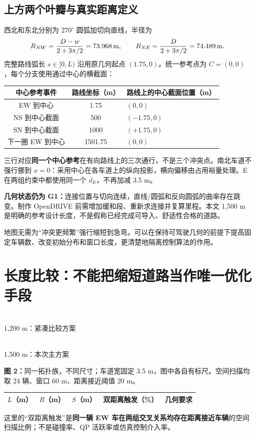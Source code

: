 \documentclass[UTF8,fontset=fandol,11pt,a4paper]{ctexart}
\newcommand{\unit}[1]{\,\mathrm{#1}}\newcommand{\nom}{\mathrm{nom}}
\newcommand{\page}[1]{\clearpage\section{#1}}
\begin{document}
\subsection{上方两个叶瓣与真实距离定义}
西北和东北分别为 $270^\circ$ 圆弧加切向直线，半径为
\[
R_{NW}=\frac{D-w}{2+3\pi/2}=\NorthWestRadius\unit{m},\qquad
R_{NE}=\frac{D}{2+3\pi/2}=\NorthEastRadius\unit{m}.
\]
完整路线弧长 $s\in[0,L)$ 沿用原几何起点 $(1.75,0)$。统一参考点为 $C=(0,0)$，每个分支使用通过中心的横截面：
\begin{center}
\begin{tabular}{ccl}\toprule
中心参考事件 & 路线坐标（m） & 路线上的中心截面位置（m）\\\midrule
EW 到中心 & 1.75 & $(0,0)$\\
NS 到中心截面 & 500 & $(-1.75,0)$\\
SN 到中心截面 & 1000 & $(+1.75,0)$\\
下一圈 EW 到中心 & 1501.75 & $(0,0)$\\\bottomrule
\end{tabular}\end{center}
三行对应\textbf{同一个中心参考}在有向路线上的三次通行，不是三个冲突点。南北车道不强行挪到 $x=0$：采用中心在各车道上的纵向投影，横向偏移由占用裕量处理。E 在两组约束中都使用同一个 $d_E$，不再加减 3.5 m。

\textbf{几何状态仍为 G1：}连接位置与切向连续，直线/圆弧和反向圆弧的曲率存在跳变。制作 OpenDRIVE 前需增加缓和段、重新求连接并复算里程。本文 1,500 m 是明确的参考设计长度，不是假称已经完成可导入、舒适性合格的道路。

地图无需为“冲突更频繁”强行缩短到急弯。可以在保持可驾驶几何的前提下提高固定车辆数、改变初始分布和窗口长度，更清楚地隔离控制算法的作用。


\page{长度比较：不能把缩短道路当作唯一优化手段}
\begin{center}
\begin{minipage}{.48\linewidth}\centering\resizebox{\linewidth}{!}{}\\{\small 1,200 m：紧凑比较方案}\end{minipage}\hfill
\begin{minipage}{.48\linewidth}\centering\resizebox{\linewidth}{!}{}\\{\small 1,500 m：本次主方案}\end{minipage}
\end{center}
\textbf{图 2：}同一拓扑族，不同尺寸；车道宽固定 3.5 m，图中各自有标尺。空间扫描均取 24 辆、窗口 60 m、距离接近阈值 20 m。
\begin{center}\small
\begin{tabular}{rrrrl}\toprule
$L$（m） & $R$（m） & $S$（m） & 双距离触发（\%） & 几何要求\\\midrule

\end{tabular}\end{center}
这里的“双距离触发”是\textbf{同一辆 EW 车在两组交叉关系均存在距离接近车辆}的空间扫描比例；不是碰撞率、QP 活跃率或仿真控制介入率。
\end{document}
